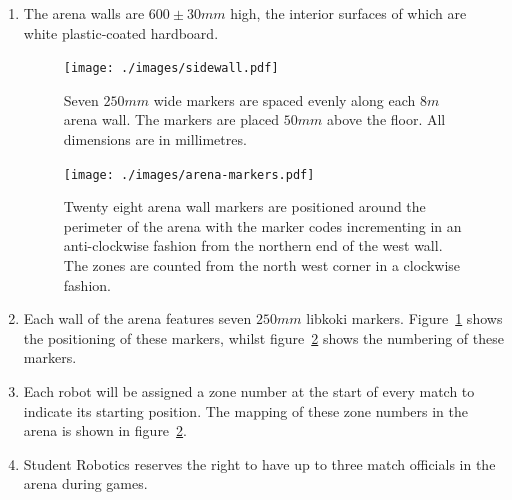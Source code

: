 \begin{enumerate}
\item The arena walls are $600\pm30mm$ high, the interior surfaces of which are white plastic-coated hardboard.

\begin{figure}
  \centering
  \texttt{[image: ./images/sidewall.pdf]}
  \caption{Seven $250mm$ wide markers are spaced evenly along each $8m$ arena wall.
           The markers are placed $50mm$ above the floor.
	   All dimensions are in millimetres.}
  \label{fig:arena-wall}
\end{figure}

\begin{figure}
  \centering
  \texttt{[image: ./images/arena-markers.pdf]}
  \caption{Twenty eight arena wall markers are positioned around the perimeter of the arena with the marker codes incrementing in an anti-clockwise fashion from the northern end of the west wall.
           The zones are counted from the north west corner in a clockwise fashion.}
  \label{fig:arena-zones}
\end{figure}

\item Each wall of the arena features seven $250mm$ libkoki markers.
      Figure~\ref{fig:arena-wall} shows the positioning of these markers, whilst figure~\ref{fig:arena-zones} shows the numbering of these markers.

\item Each robot will be assigned a zone number at the start of every match to indicate its starting position.
      The mapping of these zone numbers in the arena is shown in figure~\ref{fig:arena-zones}.

\item Student Robotics reserves the right to have up to three match officials in the arena during games.

\end{enumerate}


